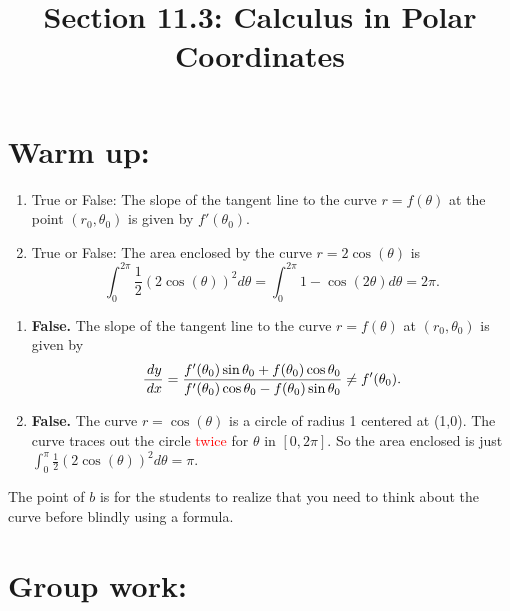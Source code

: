 \documentclass[handout]{ximera}
\title{Section 11.3: Calculus in Polar Coordinates}
\begin{document}
\begin{abstract}		\end{abstract}
\maketitle



\section{Warm up:}
\begin{enumerate}
\item True or False:  The slope of the tangent line to the curve $r = f(\theta)$ at the point $(r_0, \theta_0)$ is given by $f'(\theta_0)$.  

\item True or False: The area enclosed by the curve $r=2\cos(\theta)$ is 
$$\int_{0}^{2\pi} \frac{1}{2} (2 \cos (\theta))^2 d \theta = \int_0^{2\pi} 1-\cos(2\theta) d\theta = 2\pi.$$
\end{enumerate}

	\begin{freeResponse}
\begin{enumerate}
\item	{\bf False.}  The slope of the tangent line to the curve $r = f(\theta)$ at $(r_0, \theta_0)$ is given by
		\[
		\frac{\,d y}{\,d x} = \frac{f'(\theta_0) \sin \theta_0 + f(\theta_0) \cos \theta_0}{f'(\theta_0) \cos \theta_0 - f(\theta_0) \sin \theta_0 } \neq f'(\theta_0).
		\]

\item {\bf False.} The curve $r=\cos(\theta)$ is a circle of radius 1 centered at (1,0). The curve traces out the circle \textcolor{red}{twice} for $\theta$ in $[0, 2\pi]$. So the area enclosed is just $\int_0^{\pi} \frac{1}{2} (2 \cos(\theta))^2 d\theta = \pi$.
\end{enumerate}
	\end{freeResponse}
	
\begin{instructorNotes}
The point of $b$ is for the students to realize that you need to think about the curve before blindly using a formula.
\end{instructorNotes}







\section{Group work:}
\end{document}
